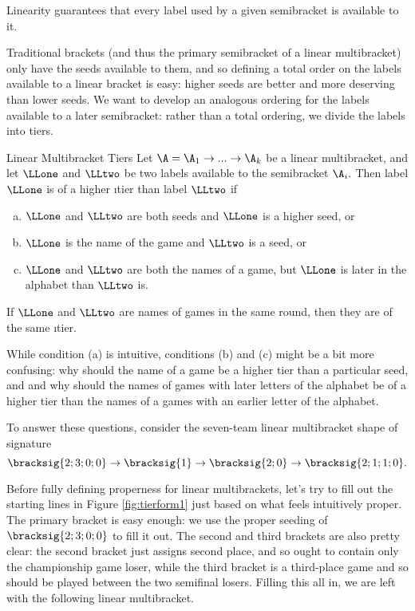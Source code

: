 {    Linearity guarantees that every label used by a given semibracket is available to it.

    Traditional brackets (and thus the primary semibracket of a linear multibracket) only have the seeds available to them, and so defining a total order on the labels available to a linear bracket is easy: higher seeds are better and more deserving than lower seeds. We want to develop an analogous ordering for the labels available to a later semibracket: rather than a total ordering, we divide the labels into tiers.

    \begin{definition}{Linear Multibracket Tiers}{}
        Let $\A = \A_1 \to ... \to \A_k$ be a linear multibracket, and let $\LLone$ and $\LLtwo$ be two labels available to the semibracket $\A_i.$ Then label $\LLone$ is of a higher \i{tier} than label $\LLtwo$ if
        \begin{enumerate}[(a)]
            \item $\LLone$ and $\LLtwo$ are both seeds and $\LLone$ is a higher seed, or
            \item $\LLone$ is the name of the game and $\LLtwo$ is a seed, or
            \item $\LLone$ and $\LLtwo$ are both the names of a game, but $\LLone$ is later in the alphabet than $\LLtwo$ is.
        \end{enumerate}
        If $\LLone$ and $\LLtwo$ are names of games in the same round, then they are of the same \i{tier}.
    \end{definition}

    While condition (a) is intuitive, conditions (b) and (c) might be a bit more confusing: why should the name of a game be a higher tier than a particular seed, and and why should the names of games with later letters of the alphabet be of a higher tier than the names of a games with an earlier letter of the alphabet.

    To answer these questions, consider the seven-team linear multibracket shape of signature $$\bracksig{2;3;0;0} \to \bracksig{1} \to \bracksig{2;0} \to \bracksig{2;1;1;0}.$$


    Before fully defining properness for linear multibrackets, let's try to fill out the starting lines in Figure \ref{fig:tierform1} just based on what feels intuitively proper. The primary bracket is easy enough: we use the proper seeding of $\bracksig{2;3;0;0}$ to fill it out. The second and third brackets are also pretty clear: the second bracket just assigns second place, and so ought to contain only the championship game loser, while the third bracket is a third-place game and so should be played between the two semifinal losers. Filling this all in, we are left with the following linear multibracket.

}
